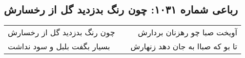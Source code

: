 \begin{center}
\section*{رباعی شماره ۱۰۳۱: چون رنگ بدزدید گل از رخسارش}
\label{sec:1031}
\begin{longtable}{l p{0.5cm} r}
چون رنگ بدزدید گل از رخسارش
&&
آویخت صبا چو رهزنان بردارش
\\
بسیار بگفت بلبل و سود نداشت
&&
تا بو که صباا به جان دهد زنهارش
\\
\end{longtable}
\end{center}
